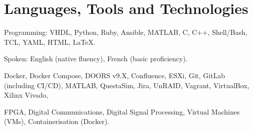 %
%
\section{Languages, Tools and Technologies}
{}
\descript{ }
Programming: \hspace{0.5em} VHDL, Python, Ruby, Ansible, MATLAB, C, C++, Shell/Bash, TCL, YAML, HTML, \LaTeX.

Spoken: \hspace{3em} English (native fluency), French (basic proficiency).

\sectionsep

\descript{ }
Docker, Docker Compose, DOORS v9.X, Confluence, ESXi, Git, GitLab (including CI/CD), MATLAB, QuestaSim, Jira, UnRAID, Vagrant, VirtualBox, Xilinx Vivado,

\sectionsep

\descript{ }
FPGA, Digital Communications, Digital Signal Processing, Virtual Machines (VMs), Containerisation (Docker).

\sectionsep